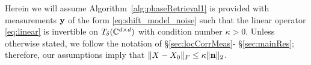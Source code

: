 
Herein we will assume Algorithm~\ref{alg:phaseRetrieval1} is provided with measurements $\mathbf y$ of the form \eqref{eq:shift_model_noise} such that the linear operator \eqref{eq:linear} is invertible on $T_{\delta}(\mathbb{C}^{d \times d})$ with condition number $\kappa > 0$.  Unless otherwise stated, we follow the notation of \S \ref{sec:locCorrMeas}- \S\ref{sec:mainRes}; therefore, our assumptions imply that $\lVert X - X_0 \rVert_F \le \kappa \lVert \mathbf n \rVert_2$.

